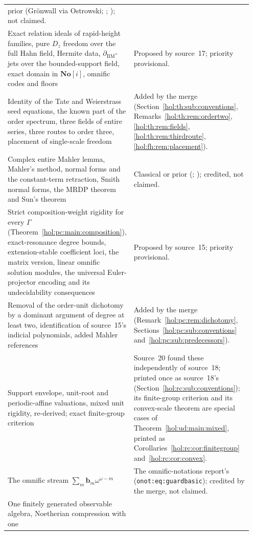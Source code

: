 \documentclass[11pt]{article}
\numberwithin{equation}{section}
\theoremstyle{definition}
\theoremstyle{remark}
\newcommand{\No}{\mathbf{No}}
\begin{document}
\begin{longtable}{@{}>{\raggedright\arraybackslash}p{0.40\linewidth}
                    >{\raggedright\arraybackslash}p{0.55\linewidth}@{}}
prior (Gr\"onwall via Ostrowski; \cite{bm}; \cite{repobst}); not claimed.\\[4pt]
Exact relation ideals of rapid-height families, pure $D_z$ freedom over the
full Hahn field, Hermite data, $\partial_{\mathrm{BM}}$-jets over the
bounded-support field, exact domain in $\No[i]$, omnific codes and floors &
Proposed by source~17; priority provisional.\\[4pt]
Identity of the Tate and Weierstrass seed equations, the known part of the
order spectrum, three fields of entire series, three routes to order three,
placement of single-scale freedom & Added by the merge
(Section~\ref{hol:th:sub:conventions}, Remarks~\ref{hol:th:rem:ordertwo},
\ref{hol:th:rem:fields}, \ref{hol:th:rem:thirdroute},
\ref{hol:fh:rem:placement}).\\[4pt]
Complex entire Mahler lemma, Mahler's method, normal forms and the
constant-term retraction, Smith normal forms, the MRDP theorem and Sun's
theorem & Classical or prior (\cite{bcr,nishioka,lmfactor,matiyasevich,sun};
\cite{repoodg}); credited, not claimed.\\[4pt]
Strict composition-weight rigidity for every $\Gamma$
(Theorem~\ref{hol:pc:main:composition}), exact-resonance degree bounds,
extension-stable coefficient loci, the matrix version, linear omnific
solution modules, the universal Euler-projector encoding and its
undecidability consequences & Proposed by source~15; priority
provisional.\\[4pt]
Removal of the order-unit dichotomy by a dominant argument of degree at least
two, identification of source~15's indicial polynomials, added Mahler
references & Added by the merge (Remark~\ref{hol:pc:rem:dichotomy},
Sections~\ref{hol:pc:sub:conventions} and~\ref{hol:pc:sub:predecessors}).\\[4pt]
Support envelope, unit-root and periodic-affine valuations, mixed unit
rigidity, re-derived; exact finite-group criterion & Source~20 found these
independently of source~18; printed once as source~18's
(Section~\ref{hol:rc:sub:conventions}); its finite-group criterion and its
convex-scale theorem are special cases of Theorem~\ref{hol:ud:main:mixed},
printed as Corollaries~\ref{hol:rc:cor:finitegroup}
and~\ref{hol:rc:cor:convex}.\\[4pt]
The omnific stream $\sum_m\mathbf b_m\omega^{\omega-m}$ & The omnific-notations
report's (\texttt{onot:eq:guardbasic}); credited by the merge, not claimed.\\[4pt]
One finitely generated observable algebra, Noetherian compression with one

\end{longtable}
\end{document}
